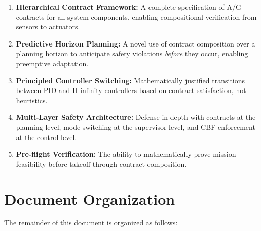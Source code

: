 \begin{enumerate}[label=\textbf{C\arabic*:}, leftmargin=*]
    \item \textbf{Hierarchical Contract Framework:} A complete specification of A/G contracts for all system components, enabling compositional verification from sensors to actuators.

    \item \textbf{Predictive Horizon Planning:} A novel use of contract composition over a planning horizon to anticipate safety violations \textit{before} they occur, enabling preemptive adaptation.

    \item \textbf{Principled Controller Switching:} Mathematically justified transitions between PID and H-infinity controllers based on contract satisfaction, not heuristics.

    \item \textbf{Multi-Layer Safety Architecture:} Defense-in-depth with contracts at the planning level, mode switching at the supervisor level, and CBF enforcement at the control level.

    \item \textbf{Pre-flight Verification:} The ability to mathematically prove mission feasibility before takeoff through contract composition.
\end{enumerate}

\section{Document Organization}

The remainder of this document is organized as follows:

